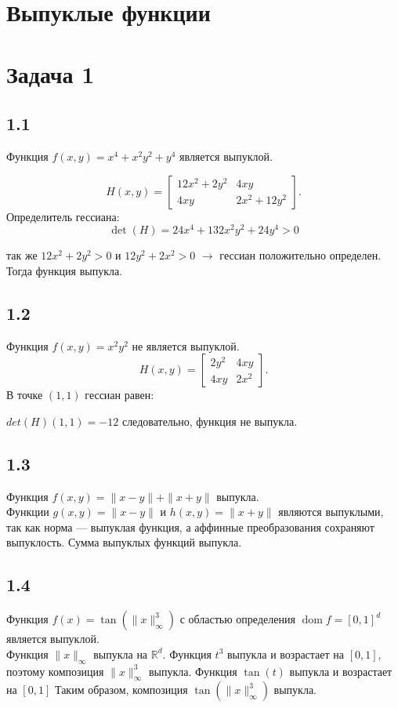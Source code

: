 \documentclass{article}
\DeclareMathOperator{\dom}{dom}
\begin{document}
\section*{Выпуклые функции}

\section*{Задача 1}

\subsection*{1.1}
Функция $ f(x, y) = x^4 + x^2 y^2 + y^4 $ является выпуклой.

$$
H(x,y) = \begin{bmatrix}
12x^2 + 2y^2 & 4xy \\
4xy & 2x^2 + 12y^2
\end{bmatrix}.
$$
Определитель гессиана: 
$$
\det(H) = 24x^4 + 132x^2y^2 + 24y^4> 0
$$

так же $12x^2 + 2y^2>0$ и $12y^2 + 2x^2 > 0$ $\rightarrow$ гессиан положительно определен. Тогда функция выпукла.

\subsection*{1.2}
Функция $f(x, y) = x^2 y^2$ не является выпуклой.
$$
H(x,y) = \begin{bmatrix}
2y^2 & 4xy \\
4xy & 2x^2
\end{bmatrix}.
$$
В точке $(1,1)$ гессиан равен:

$det(H)(1,1) = -12$ следовательно, функция не выпукла.

\subsection*{1.3}
Функция  $f(x, y) = \|x - y\| + \|x + y\| $ выпукла.\\
Функции $g(x,y) = \|x - y\| $ и $h(x,y) = \|x + y\|$  являются выпуклыми, так как норма — выпуклая функция, а аффинные преобразования сохраняют выпуклость. Сумма выпуклых функций выпукла.

\subsection*{1.4}
Функция $f(x) = \tan ( \|x\|_\infty^3 ) $ с областью определения  $\dom f = [0,1]^d $ является выпуклой. \\
Функция $\|x\|_\infty$  выпукла на  $\mathbb{R}^d $. Функция  $t^3$  выпукла и возрастает на $[0,1]$, поэтому композиция  $\|x\|_\infty^3$  выпукла. Функция  $\tan(t)$  выпукла и возрастает на $[0,1]$ Таким образом, композиция  $\tan(\|x\|_\infty^3)$  выпукла.
\end{document}
